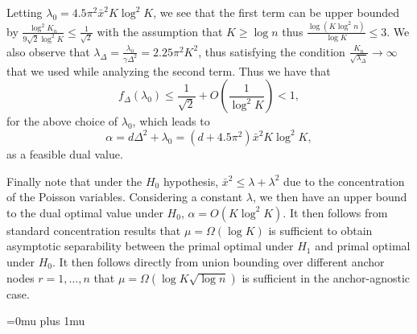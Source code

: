 \documentclass{article}
\begin{document}
Letting $\lambda_0 = 4.5 \pi^2 \bar{x}^2 K \log^2 K$, we see that the first term can be upper bounded by $\frac{\log^2 K_n}{9 \sqrt{2} \log^2 K} \leq \frac{1}{\sqrt{2}}$ with the assumption that $K \geq \log n$ thus $\frac{\log (K\log^2 n)}{\log K} \leq 3$. We also observe that $\lambda_\Delta = \frac{\lambda_0}{\gamma \Delta^2} = 2.25 \pi^2 K^2$, thus satisfying the condition $\frac{K_n}{\sqrt{\lambda_\Delta}} \to \infty$ that we used while analyzing the second term. Thus we have that
\[ f_\Delta(\lambda_0) \leq \frac{1}{\sqrt{2}} + O\left( \frac{1}{\log^2 K} \right) < 1,\]
for the above choice of $\lambda_0$, which leads to 
\[ \alpha = d \Delta^2 + \lambda_0 = (d + 4.5 \pi^2) \bar{x}^2 K \log^2 K, \]
as a feasible dual value.

Finally note that under the $H_0$ hypothesis, $\bar{x}^2 \leq \lambda + \lambda^2$ due to the concentration of the Poisson variables. Considering a constant $\lambda$, we then have an upper bound to the dual optimal value under $H_0$, $\alpha = O(K \log^2 K)$. It then follows from standard concentration results that $\mu = \Omega(\log K)$ is sufficient to obtain asymptotic separability between the primal optimal under $H_1$ and primal optimal under $H_0$. It then follows directly from union bounding over different anchor nodes $r = 1,\ldots,n$ that $\mu = \Omega(\log K \sqrt{\log n})$ is sufficient in the anchor-agnostic case.


\clearpage
\Urlmuskip=0mu plus 1mu\relax



\end{document}
